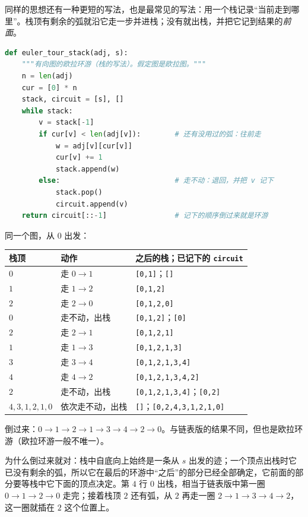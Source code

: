 同样的思想还有一种更短的写法，也是最常见的写法：用一个栈记录“当前走到哪里”。栈顶有剩余的弧就沿它走一步并进栈；没有就出栈，并把它记到结果的\emph{前面}。

\begin{lstlisting}[language=Python]
def euler_tour_stack(adj, s):
    """有向图的欧拉环游（栈的写法）。假定图是欧拉图。"""
    n = len(adj)
    cur = [0] * n
    stack, circuit = [s], []
    while stack:
        v = stack[-1]
        if cur[v] < len(adj[v]):        # 还有没用过的弧：往前走
            w = adj[v][cur[v]]
            cur[v] += 1
            stack.append(w)
        else:                           # 走不动：退回，并把 v 记下
            stack.pop()
            circuit.append(v)
    return circuit[::-1]                # 记下的顺序倒过来就是环游
\end{lstlisting}

\begin{example}
同一个图，从 $0$ 出发：
\begin{center}
\small
\begin{tabular}{lll}
\toprule
栈顶 & 动作 & 之后的栈；已记下的 \texttt{circuit} \\
\midrule
$0$ & 走 $0\to1$ & \texttt{[0,1]}；\texttt{[]} \\
$1$ & 走 $1\to2$ & \texttt{[0,1,2]} \\
$2$ & 走 $2\to0$ & \texttt{[0,1,2,0]} \\
$0$ & 走不动，出栈 & \texttt{[0,1,2]}；\texttt{[0]} \\
$2$ & 走 $2\to1$ & \texttt{[0,1,2,1]} \\
$1$ & 走 $1\to3$ & \texttt{[0,1,2,1,3]} \\
$3$ & 走 $3\to4$ & \texttt{[0,1,2,1,3,4]} \\
$4$ & 走 $4\to2$ & \texttt{[0,1,2,1,3,4,2]} \\
$2$ & 走不动，出栈 & \texttt{[0,1,2,1,3,4]}；\texttt{[0,2]} \\
$4,3,1,2,1,0$ & 依次走不动，出栈 & \texttt{[]}；\texttt{[0,2,4,3,1,2,1,0]} \\
\bottomrule
\end{tabular}
\end{center}
倒过来：$0\to1\to2\to1\to3\to4\to2\to0$。与链表版的结果不同，但也是欧拉环游（欧拉环游一般不唯一）。

为什么倒过来就对：栈中自底向上始终是一条从 $s$ 出发的迹；一个顶点出栈时它已没有剩余的弧，所以它在最后的环游中“之后”的部分已经全部确定，它前面的部分要等栈中它下面的顶点决定。第 $4$ 行 $0$ 出栈，相当于链表版中第一圈 $0\to1\to2\to0$ 走完；接着栈顶 $2$ 还有弧，从 $2$ 再走一圈 $2\to1\to3\to4\to2$，这一圈就插在 $2$ 这个位置上。
\end{example}

